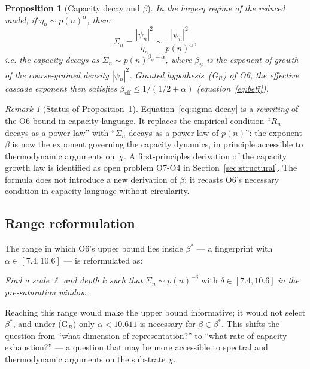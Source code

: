 \documentclass[11pt,a4paper]{article}
\newtheorem{proposition}[theorem]{Proposition}
\theoremstyle{definition}
\theoremstyle{remark}
\newtheorem{remark}[theorem]{Remark}
\newcommand{\beff}{\beta_{\mathrm{eff}}}
\begin{document}
    \begin{proposition}[Capacity decay and $\beta$]
      \label{prop:beta-capacity}
      In the large-$\eta$ regime of the reduced model, if $\eta_n \sim p(n)^\alpha$, then:
      \begin{equation}
        \label{eq:sigma-decay}
        \Sigma_n = \frac{|\psi_n|^2}{\eta_n} \sim \frac{|\psi_n|^2}{p(n)^\alpha},
      \end{equation}
      i.e. the capacity decays as $\Sigma_n \sim p(n)^{\beta_\psi - \alpha}$,
      where $\beta_\psi$ is the exponent of growth of the coarse-grained density $|\psi_n|^2$.
      Granted hypothesis~(G$_R$) of O6, the effective cascade exponent then satisfies
      $\beff \leq 1/(1/2+\alpha)$ (equation~\eqref{eq:beff}).
    \end{proposition}

    \begin{remark}[Status of Proposition~\ref{prop:beta-capacity}]
      \label{rem:beta-status}
      Equation~\eqref{eq:sigma-decay} is a \emph{rewriting} of the O6 bound in capacity language.
      It replaces the empirical condition ``$R_n$ decays as a power law'' with ``$\Sigma_n$ decays
      as a power law of $p(n)$'': the exponent $\beta$ is now the exponent governing the capacity
      dynamics, in principle accessible to thermodynamic arguments on~$\chi$.
      A first-principles derivation of the capacity growth law is identified as open
      problem O7-O4 in Section~\ref{sec:structural}.
      The formula does not introduce a new derivation of $\beta$: it recasts O6's necessary condition
      in capacity language without circularity.
    \end{remark}

  \subsection{Range reformulation}
    \label{ssec:target}

    The range in which O6's upper bound lies inside $\beta^*$ --- a fingerprint with
    $\alpha \in [7.4,10.6]$ --- is reformulated as:

    \begin{center}
      \textit{Find a scale $\ell$ and depth $k$ such that}
      $\Sigma_n \sim p(n)^{-\delta}$ with $\delta \in [7.4, 10.6]$
      \textit{in the pre-saturation window.}
    \end{center}

    Reaching this range would make the upper bound informative; it would not select $\beta^*$, and under
    (G$_R$) only $\alpha < 10.611$ is necessary for $\beta \in \beta^*$.
    This shifts the question from ``what dimension of representation?'' to ``what rate of
    capacity exhaustion?'' --- a question that may be more accessible to spectral and
    thermodynamic arguments on the substrate $\chi$.
\end{document}
